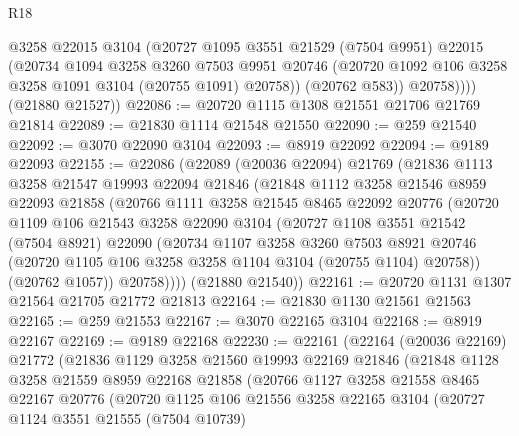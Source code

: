 \begin{lexlean}{R18}
\begin{coremodule}
              @3258
              @22015
              @3104
              (@20727
                @1095
                @3551
                @21529
                (@7504 @9951)
                @22015
                (@20734
                  @1094
                  @3258
                  @3260
                  @7503
                  @9951
                  @20746
                  (@20720 @1092 @106 @3258 @3258 @1091 @3104 (@20755 @1091) @20758))
                (@20762 @583))
              @20758))))
      (@21880 @21527))
@22086 := @20720 @1115 @1308 @21551 @21706 @21769 @21814
@22089 := @21830 @1114 @21548 @21550
@22090 := @259 @21540
@22092 := @3070 @22090 @3104
@22093 := @8919 @22092
@22094 := @9189 @22093
@22155 := @22086
    (@22089
      (@20036 @22094)
      @21769
      (@21836
        @1113
        @3258
        @21547
        @19993
        @22094
        @21846
        (@21848
          @1112
          @3258
          @21546
          @8959
          @22093
          @21858
          (@20766
            @1111
            @3258
            @21545
            @8465
            @22092
            @20776
            (@20720
              @1109
              @106
              @21543
              @3258
              @22090
              @3104
              (@20727
                @1108
                @3551
                @21542
                (@7504 @8921)
                @22090
                (@20734
                  @1107
                  @3258
                  @3260
                  @7503
                  @8921
                  @20746
                  (@20720 @1105 @106 @3258 @3258 @1104 @3104 (@20755 @1104) @20758))
                (@20762 @1057))
              @20758))))
      (@21880 @21540))
@22161 := @20720 @1131 @1307 @21564 @21705 @21772 @21813
@22164 := @21830 @1130 @21561 @21563
@22165 := @259 @21553
@22167 := @3070 @22165 @3104
@22168 := @8919 @22167
@22169 := @9189 @22168
@22230 := @22161
    (@22164
      (@20036 @22169)
      @21772
      (@21836
        @1129
        @3258
        @21560
        @19993
        @22169
        @21846
        (@21848
          @1128
          @3258
          @21559
          @8959
          @22168
          @21858
          (@20766
            @1127
            @3258
            @21558
            @8465
            @22167
            @20776
            (@20720
              @1125
              @106
              @21556
              @3258
              @22165
              @3104
              (@20727
                @1124
                @3551
                @21555
                (@7504 @10739)

\end{coremodule}
\end{lexlean}
